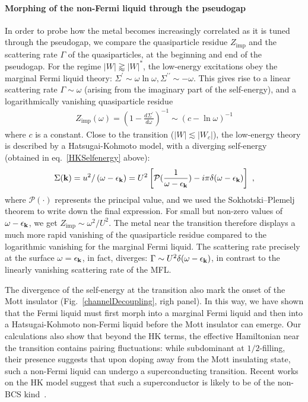 \documentclass[%
 reprint,
superscriptaddress,
groupedaddress,
 amsmath,amssymb,
 aps,
prl
]{revtex4-2}
\begin{document}
\paragraph{Morphing of the non-Fermi liquid through the pseudogap}
In order to probe how the metal becomes increasingly correlated as it is tuned through the pseudogap, we compare the quasiparticle residue \(Z_\text{imp}\) and the scattering rate \(\Gamma\) of the quasiparticles, at the beginning and end of the pseudogap. For the regime \(|W| \gtrapprox |W|^*\), the low-energy excitations obey the marginal Fermi liquid theory: \(\Sigma^{\prime} \sim \omega\ln\omega, \Sigma^{\prime\prime}\sim-\omega\). This gives rise to a linear scattering rate \(\Gamma \sim \omega\) (arising from the imaginary part of the self-energy), and a logarithmically vanishing quasiparticle residue~\cite{varma2002singular}
\begin{equation}\begin{aligned}
Z_\text{imp}(\omega) = (1 - \frac{d\Sigma^\prime}{d\omega})^{-1} \sim (c - \ln \omega)^{-1}
\end{aligned}\end{equation}
where \(c\) is a constant. Close to the transition (\(|W| \lesssim |W_c|\)), the low-energy theory is described by a Hatsugai-Kohmoto model, with a diverging self-energy (obtained in eq.~\eqref{HKSelfenergy} above): 
\begin{equation}\begin{aligned}\label{HKSelfenergy}
	\Sigma({\bf k}) = u^2/\left(\omega - \epsilon_{\bf k}\right) = U^2 \left[\mathcal{P}(\frac{1}{\omega - \epsilon_{\bf k}}) - i\pi \delta(\omega - \epsilon_{\bf k})\right]~,
\end{aligned}\end{equation}
where \(\mathcal{P}\left(\cdot\right)\) represents the principal value, and we used the Sokhotski–Plemelj theorem to write down the final expression. For small but non-zero values of \(\omega - \epsilon_{\bf k}\), we get \(Z_\text{imp} \sim \omega^2/U^2 \). The metal near the transition therefore displays a much more rapid vanishing of the quasiparticle residue compared to the logarithmic vanishing for the marginal Fermi liquid. The scattering rate precisely at the surface \(\omega=\epsilon_{\bf k}\), in fact, diverges: \(\Gamma \sim U^2\delta(\omega - \epsilon_{\bf k})\), in contrast to the linearly vanishing scattering rate of the MFL.

The divergence of the self-energy at the transition also mark the onset of the Mott insulator (Fig.~\ref{channelDecoupling}, righ panel). In this way, we have shown that the Fermi liquid must first morph into a marginal Fermi liquid and then into a Hatsugai-Kohmoto non-Fermi liquid before the Mott insulator can emerge. Our calculations also show that beyond the HK terms, the effective Hamiltonian near the transition contains pairing fluctuations: while subdominant at $1/2$-filling, their presence suggests that upon doping away from the Mott insulating state, such a non-Fermi liquid can undergo a superconducting transition. Recent works on the HK model suggest that such a superconductor is likely to be of the non-BCS kind~\cite{Phillips2020}.
\end{document}
